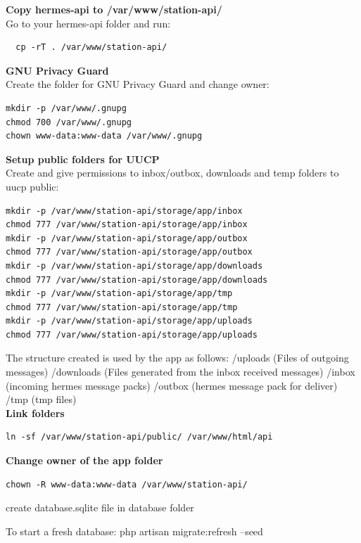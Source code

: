 \documentclass[11pt,a4paper]{article}
\begin{document}
\textbf{Copy hermes-api to /var/www/station-api/}\\

Go to your hermes-api folder and run:
\begin{verbatim}
  cp -rT . /var/www/station-api/
\end{verbatim}

\textbf{GNU Privacy Guard}\\

Create the folder for GNU Privacy Guard and change owner:
\begin{verbatim}
mkdir -p /var/www/.gnupg
chmod 700 /var/www/.gnupg
chown www-data:www-data /var/www/.gnupg
\end{verbatim}

\textbf{Setup public folders for UUCP}\\

Create and give permissions to inbox/outbox, downloads and temp folders to uucp public:
\begin{verbatim}
mkdir -p /var/www/station-api/storage/app/inbox
chmod 777 /var/www/station-api/storage/app/inbox
mkdir -p /var/www/station-api/storage/app/outbox
chmod 777 /var/www/station-api/storage/app/outbox
mkdir -p /var/www/station-api/storage/app/downloads
chmod 777 /var/www/station-api/storage/app/downloads
mkdir -p /var/www/station-api/storage/app/tmp
chmod 777 /var/www/station-api/storage/app/tmp
mkdir -p /var/www/station-api/storage/app/uploads
chmod 777 /var/www/station-api/storage/app/uploads
\end{verbatim}

The structure created is used by the app as follows:
/uploads (Files of outgoing messages)
/downloads (Files generated from the inbox received messages)
/inbox (incoming hermes message packs)
/outbox (hermes message pack for deliver)
/tmp (tmp files)\\

\textbf{Link folders}
\begin{verbatim}
ln -sf /var/www/station-api/public/ /var/www/html/api
\end{verbatim}

\textbf{Change owner of the app folder}
\begin{verbatim}
chown -R www-data:www-data /var/www/station-api/ 
\end{verbatim}

create database.sqlite file in database folder

To start a fresh database: php artisan migrate:refresh --seed\\
\end{document}
